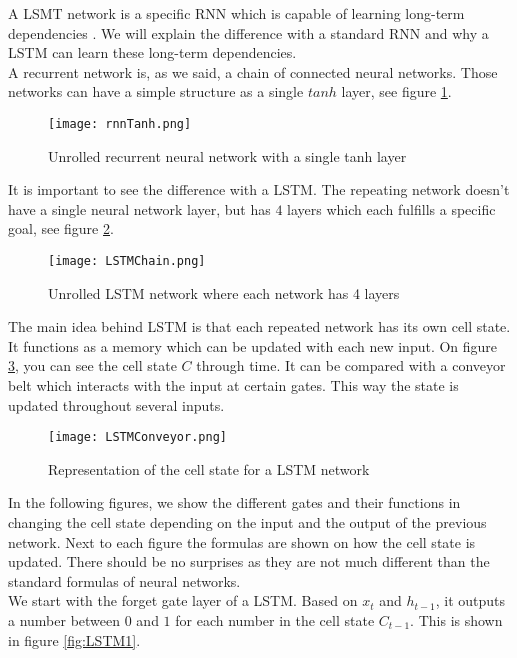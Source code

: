 A LSMT network is a specific RNN which is capable of learning long-term dependencies \cite{lstmDep:thesis}. We will explain the difference with a standard RNN and why a LSTM can learn these long-term dependencies. \\

A recurrent network is, as we said, a chain of connected neural networks. Those networks can have a simple structure as a single $tanh$ layer, see figure \ref{fig:rnnTanh}.

\begin{figure}[H]
	\centering
	\texttt{[image: rnnTanh.png]}
	\caption{Unrolled recurrent neural network with a single tanh layer \cite{lstmGood:online}}
	\label{fig:rnnTanh}
\end{figure} 

It is important to see the difference with a LSTM. The repeating network doesn't have a single neural network layer, but has $4$ layers which each fulfills a specific goal, see figure \ref{fig:LSTMChain}.

\begin{figure}[H]
	\centering
	\texttt{[image: LSTMChain.png]}
	\caption{Unrolled LSTM network where each network has 4 layers \cite{lstmGood:online}}
	\label{fig:LSTMChain}
\end{figure} 

The main idea behind LSTM is that each repeated network has its own cell state. It functions as a  memory which can be updated with each new input. On figure \ref{fig:LSTMConveyor}, you can see the cell state $C$ through time. It can be compared with a conveyor belt which interacts with the input at certain gates. This way the state is updated throughout several inputs.

\begin{figure}[H]
	\centering
	\texttt{[image: LSTMConveyor.png]}
	\caption{Representation of the cell state for a LSTM network \cite{lstmGood:online}}
	\label{fig:LSTMConveyor}
\end{figure} 

In the following figures, we show the different gates and their functions in changing the cell state depending on the input and the output of the previous network. Next to each figure the formulas are shown on how the cell state is updated. There should be no surprises as they are not much different than the standard formulas of neural networks. \\

We start with the forget gate layer of a LSTM. Based on $x_t$ and $h_{t-1}$, it outputs a number between $0$ and $1$ for each number in the cell state $C_{t-1}$. This is shown in figure \ref{fig:LSTM1}.

